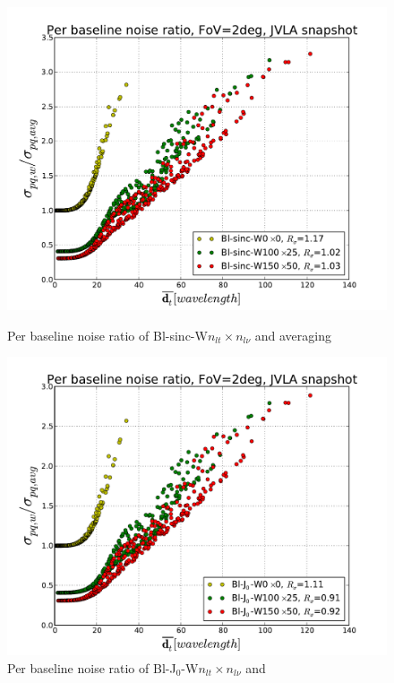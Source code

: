 \documentclass[useAMS,usenatbib]{mn2e}
\begin{document}
\begin{figure}
 \centering
    \begin{minipage}{0.38\linewidth}\includegraphics[width=1\textwidth]{./Figures/per-baseline-noise-ratio-sinc.pdf}
  \caption{Per baseline noise ratio of Bl-sinc-W$n_{lt}\times n_{l\nu}$ and averaging}\label{fig:per-baseline-noise-ratio-sinc}
  \end{minipage}
  \hspace{1cm}
  \begin{minipage}{0.38\linewidth}\includegraphics[width=1\textwidth]{./Figures/per-baseline-noise-ratio-bessel.pdf}
  \caption{Per baseline noise ratio of Bl-J$_0$-W$n_{lt}\times n_{l\nu}$ and 
}
\end{minipage}
\end{figure}
\end{document}
